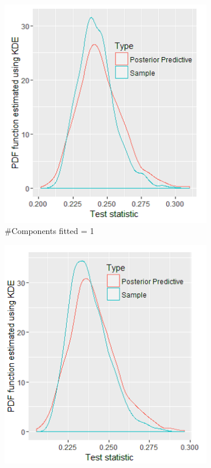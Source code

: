 \begin{figure}[!htb]
\centering
\captionsetup{justification=centering}
\begin{subfigure}[b]{0.4\textwidth}
		\includegraphics[width=\textwidth]{mainmatter/chapter_6_blood_donor/ppc_1comp.png}
        \caption{\label{fig : ppc_blood_donor_1comp}\#Components fitted = 1}
	\end{subfigure}
	\begin{subfigure}[b]{0.4\textwidth}
		\includegraphics[width=\textwidth]{mainmatter/chapter_6_blood_donor/ppc_2comp.png}	

\end{subfigure}
\end{figure}
